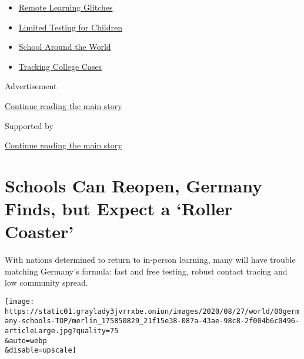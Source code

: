 \begin{itemize}
\tightlist
\item
  \href{https://www.nytimes3xbfgragh.onion/2020/09/08/us/school-districts-cyberattacks-glitches.html?name=styln-coronavirus-schools-reopening\&region=TOP_BANNER\&block=storyline_menu_recirc\&action=click\&pgtype=Article\&impression_id=1579b561-f2bd-11ea-8255-47bcf7935a1c\&variant=undefined}{Remote
  Learning Glitches}
\item
  \href{https://www.nytimes3xbfgragh.onion/2020/09/08/upshot/children-testing-shortfalls-virus.html?name=styln-coronavirus-schools-reopening\&region=TOP_BANNER\&block=storyline_menu_recirc\&action=click\&pgtype=Article\&impression_id=1579b562-f2bd-11ea-8255-47bcf7935a1c\&variant=undefined}{Limited
  Testing for Children}
\item
  \href{https://www.nytimes3xbfgragh.onion/2020/09/01/world/schools-reopen-globe-students.html?name=styln-coronavirus-schools-reopening\&region=TOP_BANNER\&block=storyline_menu_recirc\&action=click\&pgtype=Article\&impression_id=1579b563-f2bd-11ea-8255-47bcf7935a1c\&variant=undefined}{School
  Around the World}
\item
  \href{https://www.nytimes3xbfgragh.onion/interactive/2020/us/covid-college-cases-tracker.html?name=styln-coronavirus-schools-reopening\&region=TOP_BANNER\&block=storyline_menu_recirc\&action=click\&pgtype=Article\&impression_id=1579b564-f2bd-11ea-8255-47bcf7935a1c\&variant=undefined}{Tracking
  College Cases}
\end{itemize}

Advertisement

\protect\hyperlink{after-top}{Continue reading the main story}

Supported by

\protect\hyperlink{after-sponsor}{Continue reading the main story}

\hypertarget{schools-can-reopen-germany-finds-but-expect-a-roller-coaster}{%
\section{Schools Can Reopen, Germany Finds, but Expect a `Roller
Coaster'}\label{schools-can-reopen-germany-finds-but-expect-a-roller-coaster}}

With nations determined to return to in-person learning, many will have
trouble matching Germany's formula: fast and free testing, robust
contact tracing and low community spread.

\texttt{[image: https://static01.graylady3jvrrxbe.onion/images/2020/08/27/world/00germany-schools-TOP/merlin\_175850829\_21f15e38-087a-43ae-98c8-2f004b6c0496-articleLarge.jpg?quality=75\\\&auto=webp\\\&disable=upscale]}

